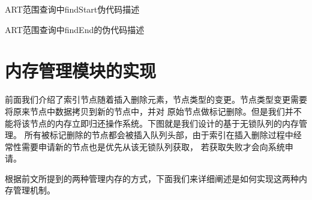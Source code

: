 \begin{breakablealgorithm} 
    \caption{ART范围查询中findStart伪代码描述} 
    \begin{algorithmic}[1]
    \begin{footnotesize}
   
        \RETURN
    \ELSE
            \ELSE
            \ENDIF 
        \ENDFOR
    \ENDIF  
    \end{footnotesize}
    \end{algorithmic}
\end{breakablealgorithm}

\begin{breakablealgorithm} 
    \caption{ART范围查询中findEnd的伪代码描述} 
    \begin{algorithmic}[1]
    \begin{footnotesize}
        \RETURN
    \ELSE
            \ELSE
            \ENDIF 
        \ENDFOR
    \ENDIF  
    \end{footnotesize}
    \end{algorithmic}
\end{breakablealgorithm}

\section{内存管理模块的实现}
前面我们介绍了索引节点随着插入删除元素，节点类型的变更。节点类型变更需要将原来节点中数据拷贝到新的节点中，并对
原始节点做标记删除。但是我们并不能将该节点的内存立即归还操作系统。下图就是我们设计的基于无锁队列的内存管理。
所有被标记删除的节点都会被插入队列头部，由于索引在插入删除过程中经常性需要申请新的节点也是优先从该无锁队列获取，
若获取失败才会向系统申请。

根据前文所提到的两种管理内存的方式，下面我们来详细阐述是如何实现这两种内存管理机制。

